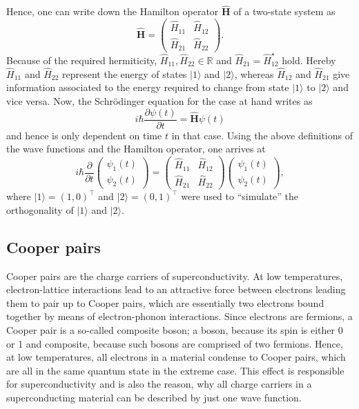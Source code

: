 \documentclass{report}
\numberwithin{tm}{section}
\newcommand\matr[1]{\ensuremath{\boldsymbol{\mathbf{#1}}}}
\begin{document}
Hence, one can write down the Hamilton operator $\hat{\matr{H}}$ of a two-state system as \begin{equation}
	\hat{\matr{H}} = \begin{pmatrix}
		\hat{H}_{11} & \hat{H}_{12} \\
		\hat{H}_{21} & \hat{H}_{22}
	\end{pmatrix}.
\end{equation} Because of the required hermiticity, $\hat{H}_{11}, \hat{H}_{22} \in \mathbb{R}$ and $\hat{H}_{21} = \hat{H}_{12}^\star$ hold. Hereby $\hat{H}_{11}$ and $\hat{H}_{22}$ represent the energy of states $|1\rangle$ and $|2\rangle$, whereas $\hat{H}_{12}$ and $\hat{H}_{21}$ give information associated to the energy required to change from state $|1\rangle$ to $|2\rangle$ and vice versa. Now, the Schrödinger equation for the case at hand writes as \begin{equation}
i\hbar \frac{\partial \psi(t)}{\partial t} = \hat{\matr{H}}\psi(t)
\end{equation} and hence is only dependent on time $t$ in that case. Using the above definitions of the wave functions and the Hamilton operator, one arrives at \begin{equation}\label{eq:twostatequantumsystem}
i\hbar\frac{\partial}{\partial t}\begin{pmatrix}
	\psi_1(t) \\ \psi_2(t)
\end{pmatrix} = \begin{pmatrix}
\hat{H}_{11} & \hat{H}_{12} \\
\hat{H}_{21} & \hat{H}_{22}
\end{pmatrix}\begin{pmatrix}
\psi_1(t) \\ \psi_2(t)
\end{pmatrix},
\end{equation} where $|1\rangle = (1,0)^\top$ and $|2\rangle = (0,1)^\top$ were used to ``simulate'' the orthogonality of $|1\rangle$ and $|2\rangle$.

\subsection{Cooper pairs}
Cooper pairs are the charge carriers of superconductivity. At low temperatures, electron-lattice interactions lead to an attractive force between electrons leading them to pair up to Cooper pairs, which are essentially two electrons bound together by means of electron-phonon interactions. Since electrons are fermions, a Cooper pair is a so-called composite boson; a boson, because its spin is either 0 or 1 and composite, because such bosons are comprised of two fermions. Hence, at low temperatures, all electrons in a material condense to Cooper pairs, which are all in the same quantum state in the extreme case. This effect is responsible for superconductivity and is also the reason, why all charge carriers in a superconducting material can be described by just one wave function.
\end{document}
